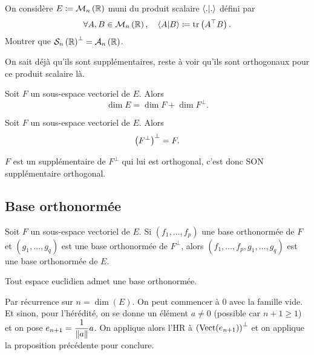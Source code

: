 \documentclass{magnolia}
\begin{document}
\begin{exoUnique}
  \exo On considère $E\coloneqq\mathcal{M}_{n}\left(\mathbb{R}\right)$ muni du produit scalaire $\left\langle {.}\middle|{.}\right\rangle$ défini par
    \[\forall A,B\in\mathcal{M}_{n}\left(\mathbb{R}\right) ,\quad \left\langle {A}\middle|{B}\right\rangle\coloneqq\operatorname{tr}\left({A}^{\top}B\right).\]
    Montrer que $\mathcal{S}_n\left(\mathbb{R}\right)^\perp=\mathcal{A}_n\left(\mathbb{R}\right)$.
    \begin{sol}
    On sait déjà qu'ils sont supplémentaires, reste à voir qu'ils sont orthogonaux pour ce produit scalaire là.
    \end{sol}
  \end{exoUnique}

\begin{proposition}[utile=-3]
Soit $F$ un sous-espace vectoriel de $E$. Alors
\[\dim E=\dim F+\dim F^\perp.\]
\end{proposition}



\begin{proposition}[utile=2]
Soit $F$ un sous-espace vectoriel de $E$. Alors
\[\left(F^\perp\right)^\perp=F.\]
\end{proposition}

\begin{preuve}
$F$ est un supplémentaire de $F^\perp$ qui lui est orthogonal, c'est donc SON supplémentaire orthogonal.
\end{preuve}



\subsection{Base orthonormée}

\begin{proposition}[utile=-3]
Soit $F$ un sous-espace vectoriel de $E$. Si $(f_1,\ldots,f_p)$ une base
orthonormée de $F$ et $(g_1,\ldots,g_q)$ est une base orthonormée de $F^\perp$,
alors $(f_1,\ldots,f_p,g_1,\ldots,g_q)$ est une base orthonormée de $E$.
\end{proposition}

\begin{proposition}[utile=-3]
Tout espace euclidien admet une base orthonormée.  
\end{proposition}

\begin{preuve}
Par récurrence sur $n=\dim(E)$. On peut commencer à $0$ avec la famille vide. Et sinon, pour l'hérédité, on se donne un élément $a\neq 0$ (possible car $n+1\geq 1$) et on pose $e_{n+1}=\dfrac{1}{\left\|a\right\|}a$. On applique alors l'HR à $\left(\operatorname{Vect}(e_{n+1})\right)^\perp$ et on applique la proposition précédente pour conclure.
\end{preuve}
\end{document}
